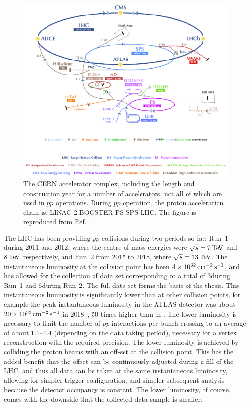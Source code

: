 \begin{figure}[tb]
    \centering
    \includegraphics[width=0.9\columnwidth]{figures/detector/CERN_complex.png}
    \caption{The CERN accelerator complex, including the length and construction year for a number of accelerators, not all of which are used in $pp$ operations. During $pp$ operation, the proton acceleration chain is: LINAC 2 \to BOOSTER \to PS \to SPS \to LHC.  The figure is reproduced from Ref.~\cite{CERNcomplex}.}
    \label{fig:CERN_accerators}
\end{figure}

The LHC has been providing $pp$ collisions during two periods so far: Run~1 during 2011 and 2012, where the centre-of mass energies were $\sqrt{s}=7\text{\,Te\kern -0.1em V}$ and $8\text{\,Te\kern -0.1em V}$ respectively, and Run~2 from 2015 to 2018, where $\sqrt{s}=13\text{\,Te\kern -0.1em V}$. The instantaneous luminosity at the \lhcb collision point has been $4\times 10^{32} \text{\,cm}^{-2} \,\mathrm s^{-1}$, and has allowed for the collection of data set corresponding to a total of 3\invfb during Run~1 and 6\invfb during Run~2. The full data set forms the basis of the thesis. This instantaneous luminosity is significantly lower than at other collision points, for example the peak instantaneous luminosity in the ATLAS detector was about $20\times 10^{33}\text{\,cm}^{-2}\,\mathrm s^{-1}$ in 2018~\cite{ATLAS-CONF-2019-021},  50 times higher than in \lhcb. The lower luminosity is necessary to limit the number of $pp$ interactions per bunch crossing to an average of about 1.1--1.4 (depending on the data taking period), necessary for a vertex reconstruction with the required precision. The lower luminosity is achieved by colliding the proton beams with an off-set at the \lhcb collision point. This has the added benefit that the offset can be continuously adjusted during a fill of the LHC, and thus all data can be taken at the same instantaneous luminosity, allowing for simpler trigger configuration, and simpler subsequent analysis because the detector occupancy is constant. The lower luminosity, of course, comes with the downside that the collected data sample is smaller.

